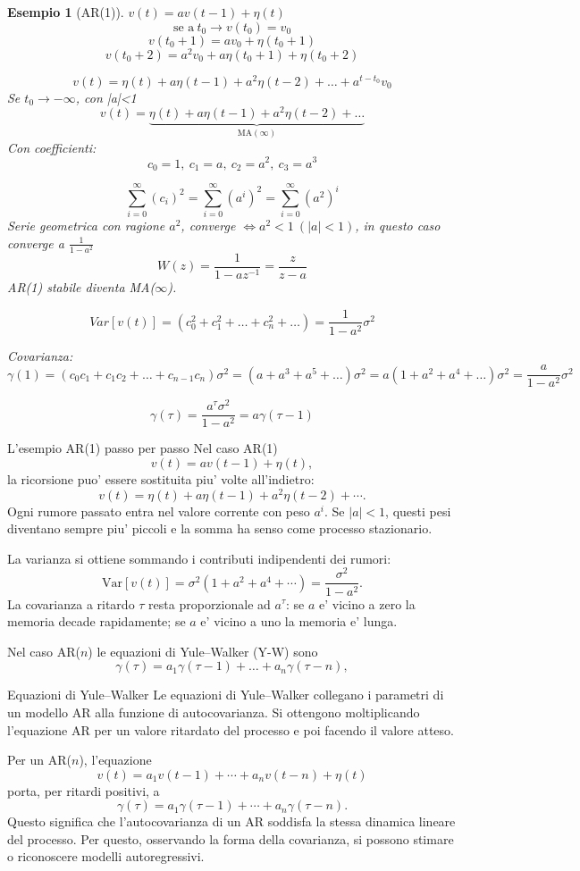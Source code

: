 \documentclass[11pt,a4paper]{article}
\newtheorem{example}{Esempio}
\begin{document}
\begin{example}[AR(1)]
$v(t)=a v(t-1)+\eta(t)$  
\[
\text{se a}\  t_0 \rightarrow v(t_0) = v_0
\]
\[
v(t_0+1) = av_0+\eta(t_0+1)
\]
\[
v(t_0+2) = a^2v_0+a\eta(t_0+1) + \eta(t_0+2)
\]

\[
v(t)=\eta(t)+a\eta(t-1)+a^2\eta(t-2)+\dots+a^{t-t_0}v_0
\]
Se $t_0\to-\infty$, con |a|<1
\[
v(t)=
\underbrace{\eta(t)+a\eta(t-1)+a^2\eta(t-2)+\dots}_{\text{MA}(\infty)}
\]
Con coefficienti:
\[
c_0 = 1,\ c_1 = a,\  c_2 = a^2,\  c_3 = a^3
\]

\[
\sum_{i=0}^\infty(c_i)^2 = \sum_{i=0}^\infty(a^i)^2 = \sum_{i=0}^\infty(a^2)^i
\]
Serie geometrica con ragione $a^2$, converge $\iff a^2 < 1 \ (|a|<1)$, in questo caso converge a $\frac{1}{1-a^2}$
\[
W(z) = \frac{1}{1-az^{-1}} = \frac{z}{z-a}
\]
AR(1) stabile diventa MA($\infty$). 

\[
Var[v(t)] = (c_0^2+c_1^2+\dots+c_n^2+\dots) = \frac{1}{1-a^2}\sigma^2
\]

Covarianza:
\[
\gamma(1) = (c_0c_1+c_1c_2+\dots+c_{n-1}c_n)\sigma^2 = (a+a^3+a^5+\dots)\sigma^2 = a(1+a^2+a^4+\dots)\sigma^2 = \frac{a}{1-a^2}\sigma^2
\]

\[
\gamma(\tau) = \frac{a^\tau\sigma^2}{1-a^2} = a\gamma(\tau-1)
\]

\end{example}

\begin{spiegazione}{L'esempio AR(1) passo per passo}
Nel caso AR(1)
\[
v(t)=av(t-1)+\eta(t),
\]
la ricorsione puo' essere sostituita piu' volte all'indietro:
\[
v(t)=\eta(t)+a\eta(t-1)+a^2\eta(t-2)+\cdots.
\]
Ogni rumore passato entra nel valore corrente con peso $a^i$. Se $|a|<1$, questi pesi diventano sempre piu' piccoli e la somma ha senso come processo stazionario.

La varianza si ottiene sommando i contributi indipendenti dei rumori:
\[
\mathrm{Var}[v(t)]=\sigma^2(1+a^2+a^4+\cdots)=\frac{\sigma^2}{1-a^2}.
\]
La covarianza a ritardo $\tau$ resta proporzionale ad $a^\tau$: se $a$ e' vicino a zero la memoria decade rapidamente; se $a$ e' vicino a uno la memoria e' lunga.
\end{spiegazione}

Nel caso AR($n$) le equazioni di Yule--Walker (Y-W) sono
\[
\gamma(\tau)=a_1\gamma(\tau-1)+\dots+a_n\gamma(\tau-n),
\]

\begin{spiegazione}{Equazioni di Yule--Walker}
Le equazioni di Yule--Walker collegano i parametri di un modello AR alla funzione di autocovarianza. Si ottengono moltiplicando l'equazione AR per un valore ritardato del processo e poi facendo il valore atteso.

Per un AR($n$), l'equazione
\[
v(t)=a_1v(t-1)+\cdots+a_nv(t-n)+\eta(t)
\]
porta, per ritardi positivi, a
\[
\gamma(\tau)=a_1\gamma(\tau-1)+\cdots+a_n\gamma(\tau-n).
\]
Questo significa che l'autocovarianza di un AR soddisfa la stessa dinamica lineare del processo. Per questo, osservando la forma della covarianza, si possono stimare o riconoscere modelli autoregressivi.
\end{spiegazione}
\end{document}
